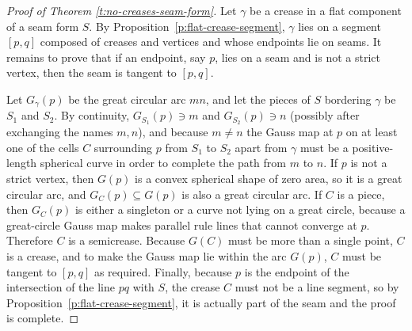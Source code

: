 \documentclass{article}
\newtheorem{lemma}[theorem]{Lemma}
\newcommand\comment[1]{}
\begin{document}
\begin{proof}[Proof of Theorem \ref{t:no-creases-seam-form}]
  Let $\gamma$ be a crease in a flat component of a seam form $S$.  By
  Proposition~\ref{p:flat-crease-segment}, $\gamma$ lies on a segment
  $[p, q]$ composed of creases and vertices and whose endpoints lie on seams.  It remains
  to prove that if an endpoint, say $p$, lies on a seam and is not a
  strict vertex, then the seam is tangent to $[p, q]$.

  Let $G_\gamma(p)$ be the great circular arc $mn$, and let the pieces of $S$
  bordering $\gamma$ be $S_1$ and $S_2$.  By continuity,
  $G_{S_1}(p)
  \ni m$ and $G_{S_2}(p) \ni n$ (possibly after exchanging the names
  $m, n$), and because $m \neq n$ the Gauss map at $p$ on at least one
  of the cells $C$ surrounding $p$ from $S_1$ to $S_2$ apart from
  $\gamma$ must be a positive-length spherical curve in order to
  complete the path from $m$ to $n$.
  If $p$ is not a strict vertex, then $G(p)$ is a convex spherical
  shape of zero area, so it is a great circular arc,
  and $G_C(p) \subseteq G(p)$ is also a great circular arc.
  If $C$ is a piece, then $G_C(p)$ is either a singleton or a
  curve not lying on a great circle, because a great-circle Gauss map
  makes parallel rule lines that cannot converge at $p$.
  Therefore $C$ is a semicrease.  Because $G(C)$ must be more than a single
  point, $C$ is a crease, and to make the Gauss map lie within
  the arc $G(p)$, $C$ must be tangent to $[p,q]$ as required.  Finally,
  because $p$ is the endpoint of the intersection of the line $pq$
  with $S$, the crease $C$ must not be a line segment, so by
  Proposition~\ref{p:flat-crease-segment},
  it is actually part of the seam and the proof is complete.
\end{proof}


\comment{
\begin{lemma}\label{l:no-pc-one-crease}
  If a point $p$ on the surface of a convex body is not a vertex, then either
  \begin{enumerate}
  \item no creases pass through $p$, nor approach with nonzero
    limiting dihedral angle at $p$; or
  \item all creases with nonzero limiting dihedral angle at $p$ are
    tangent to a common line\end{enumerate}
\end{lemma}
\begin{proof}
  The image $G(p)$ of the Gauss map must be a convex set of zero area,
  because $p$ is not a vertex.  The only such figures on the sphere are
  the singleton points and the great circular arcs.

  If $G(p)$ is a singleton point, then $p$ has only a single
  normal and tangent plane; so no crease can have nonzero dihedral
  angle at $p$, as it would bring two distinct normals and a
  great circular arc between them.

  If $G(p)$ is a great circular arc, then it corresponds to a dihedral
  angle about the line perpendicular to this arc; any nonzero crease
  at $p$ not tangent to this line would introduce an arc of normals
  outside of $G(p)$, so no such crease can be present.
\end{proof}
}
\end{document}
